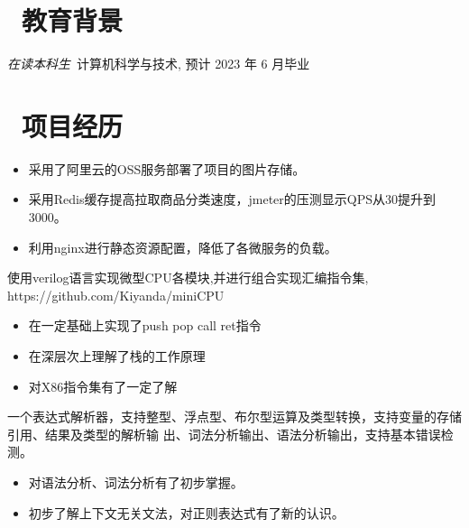 \documentclass{resume}
\begin{document}
\normalsize{%

\section{\faGraduationCap\ 教育背景}
\textit{在读本科生}\ 计算机科学与技术, 预计 2023 年 6 月毕业


\section{\faUsers\ 项目经历}
\begin{itemize}
  \item 采用了阿里云的OSS服务部署了项目的图片存储。
  \item 采用Redis缓存提高拉取商品分类速度，jmeter的压测显示QPS从30提升到3000。
  \item 利用nginx进行静态资源配置，降低了各微服务的负载。
\end{itemize}

使用verilog语言实现微型CPU各模块,并进行组合实现汇编指令集, https://github.com/Kiyanda/miniCPU
\begin{itemize}
  \item 在一定基础上实现了push pop call ret指令
  \item 在深层次上理解了栈的工作原理
  \item 对X86指令集有了一定了解
\end{itemize}

一个表达式解析器，支持整型、浮点型、布尔型运算及类型转换，支持变量的存储引用、结果及类型的解析输
出、词法分析输出、语法分析输出，支持基本错误检测。
\begin{itemize}
  \item 对语法分析、词法分析有了初步掌握。
  \item 初步了解上下文无关文法，对正则表达式有了新的认识。
\end{itemize}



}
\end{document}
